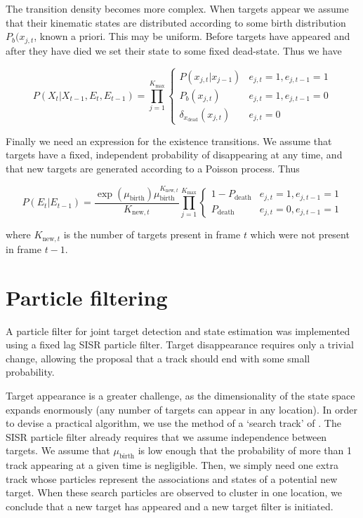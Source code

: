 The transition density becomes more complex. When targets appear we assume that their kinematic states are distributed according to some birth distribution $P_b(x_{j,t}$, known a priori. This may be uniform. Before targets have appeared and after they have died we set their state to some fixed dead-state. Thus we have

\begin{equation}
P(X_t|X_{t-1}, E_t, E_{t-1}) = \prod_{j=1}^{K_{\max}} \begin{cases} P(x_{j,t}|x_{j-1}) & e_{j,t} = 1, e_{j,t-1} = 1 \\ P_b(x_{j,t}) & e_{j,t} = 1, e_{j,t-1} = 0 \\ \delta_{x_{\text{dead}}}(x_{j,t}) & e_{j,t} = 0 \end{cases}
\label{eq:MTFactorisedTransitionWithE}
\end{equation}

Finally we need an expression for the existence transitions. We assume that targets have a fixed, independent probability of disappearing at any time, and that new targets are generated according to a Poisson process. Thus

\begin{equation}
P(E_t|E_{t-1}) = \frac{ \exp(\mu_{\text{birth}}) \mu_{\text{birth}}^{K_{\text{new},t}} }{ K_{\text{new},t} } \prod_{j=1}^{K_{\max}} \begin{cases} 1-P_{\text{death}} & e_{j,t} = 1, e_{j,t-1} = 1 \\ P_{\text{death}} & e_{j,t} = 0, e_{j,t-1} = 1 \end{cases}
\label{eq:MTExistenceTransition}
\end{equation}

where $K_{\text{new},t}$ is the number of targets present in frame $t$ which were not present in frame $t-1$.



\section{Particle filtering}
A particle filter for joint target detection and state estimation was implemented using a fixed lag SISR particle filter. Target disappearance requires only a trivial change, allowing the proposal that a track should end with some small probability.

Target appearance is a greater challenge, as the dimensionality of the state space expands enormously (any number of targets can appear in any location). In order to devise a practical algorithm, we use the method of a `search track' of \cite{Horridge2009}. The SISR particle filter already requires that we assume independence between targets. We assume that $\mu_{\text{birth}}$ is low enough that the probability of more than 1 track appearing at a given time is negligible. Then, we simply need one extra track whose particles represent the associations and states of a potential new target. When these search particles are observed to cluster in one location, we conclude that a new target has appeared and a new target filter is initiated.


